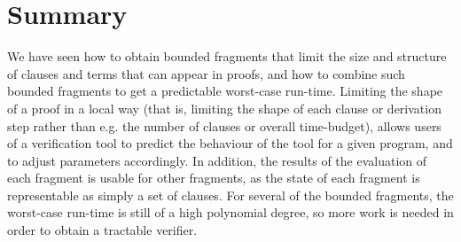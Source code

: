 \section{Summary}
We have seen how to obtain bounded fragments that limit the size and structure of clauses and terms that can appear in proofs, and how to combine such bounded fragments to get a predictable worst-case run-time. 
Limiting the shape of a proof in a local way (that is, limiting the shape of each clause or derivation step rather than e.g. the number of clauses or overall time-budget), allows users of a verification tool to predict the behaviour of the tool for a given program, and to adjust parameters accordingly. In addition, the results of the evaluation of each fragment is usable for other fragments, as the state of each fragment is representable as simply a set of clauses. For several of the bounded fragments, the worst-case run-time is still of a high polynomial degree, so more work is needed in order to obtain a tractable verifier.
